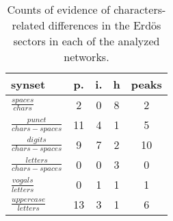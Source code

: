 \begin{table}[h!]
\begin{center}
\begin{tabular}{| l | c | c | c | c |}\hline
synset & p. & i. & h & peaks \\\hline
$\frac{spaces}{chars}$ & 2  & 0  & 8  & 2 \\\hline
$\frac{punct}{chars-spaces}$ & 11  & 4  & 1  & 5 \\\hline
$\frac{digits}{chars-spaces}$ & 9  & 7  & 2  & 10 \\\hline
$\frac{letters}{chars-spaces}$ & 0  & 0  & 3  & 0 \\\hline
$\frac{vogals}{letters}$ & 0  & 1  & 1  & 1 \\\hline
$\frac{uppercase}{letters}$ & 13  & 3  & 1  & 6 \\\hline
\end{tabular}
\caption{Counts of evidence of characters-related differences in the Erd\"os sectors in each of the analyzed networks.}
\end{center}
\end{table}
